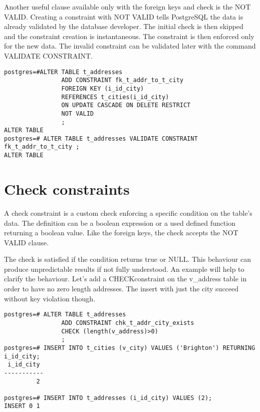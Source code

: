 Another useful clause available only with the foreign keys and check is the NOT VALID. Creating a constraint with NOT VALID tells PostgreSQL the data is already
validated by the database developer. The initial check is then skipped and the constraint creation is
instantaneous. The constraint is then 
enforced only for the new data. The invalid constraint can be validated later with the command VALIDATE
CONSTRAINT.

\begin{lstlisting}[style=pgsql]
postgres=#ALTER TABLE t_addresses
                ADD CONSTRAINT fk_t_addr_to_t_city
                FOREIGN KEY (i_id_city)
                REFERENCES t_cities(i_id_city)
                ON UPDATE CASCADE ON DELETE RESTRICT
                NOT VALID
                ;
ALTER TABLE
postgres=# ALTER TABLE t_addresses VALIDATE CONSTRAINT fk_t_addr_to_t_city ;
ALTER TABLE

\end{lstlisting}



\section{Check constraints}
\label{sec:CHECKCNS}

A check constraint is a custom check enforcing a specific condition on the table's data.  The definition
can be a boolean expression or a used defined function returning a boolean value. Like the foreign
keys, the check accepts the NOT VALID clause.\newline

The check is satisfied if the condition returns true or NULL. This behaviour can produce unpredictable
results if not fully understood. An example will help to clarify the behaviour. Let's add
a CHECKconstraint on the v\_address table in order to have no zero length addresses. The insert with
just the city succeed without key violation though.

\begin{lstlisting}[style=pgsql]
postgres=# ALTER TABLE t_addresses
                ADD CONSTRAINT chk_t_addr_city_exists
                CHECK (length(v_address)>0)
                ; 
postgres=# INSERT INTO t_cities (v_city) VALUES ('Brighton') RETURNING i_id_city;
 i_id_city 
-----------
         2

postgres=# INSERT INTO t_addresses (i_id_city) VALUES (2);
INSERT 0 1
\end{lstlisting}


